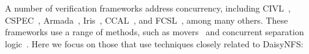
A number of verification frameworks address concurrency, including
CIVL~\cite{hawblitzel:civl}, CSPEC~\cite{chajed:cspec},
Armada~\cite{lorch:armada}, Iris~\cite{jung:iris-jfp}, CCAL~\cite{gu:certikos-ccal},
and FCSL~\cite{sergey:fcsl}, among many others. These frameworks use a range of
methods, such as movers~\cite{lipton:movers} and concurrent separation
logic~\cite{brookes:csl}. Here we focus on those that use techniques closely related to DaisyNFS:




